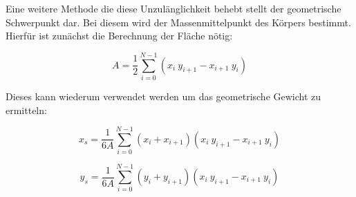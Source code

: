 Eine weitere Methode die diese Unzulänglichkeit behebt stellt der geometrische Schwerpunkt dar.
Bei diesem wird der Massenmittelpunkt des Körpers bestimmt.\cite{Papula.2006} Hierfür ist zunächst die Berechnung der Fläche nötig:

\begin{equation}
A = \frac{1}{2}\sum_{i=0}^{N-1} (x_i\ y_{i+1} - x_{i+1}\ y_i)
\end{equation}

Dieses kann wiederum verwendet werden um das geometrische Gewicht zu ermitteln:

\begin{equation}
x_s = \frac{1}{6A}\sum_{i=0}^{N-1}(x_i+x_{i+1})(x_i\ y_{i+1} - x_{i+1}\ y_i)
\end{equation}

\begin{equation}
y_s = \frac{1}{6A}\sum_{i=0}^{N-1}(y_i+y_{i+1})(x_i\ y_{i+1} - x_{i+1}\ y_i)
\end{equation}

